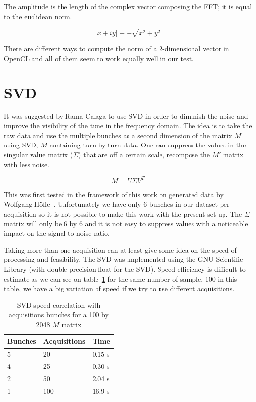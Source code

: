 The amplitude is the length of the complex vector composing the \gls{FFT}; it is equal to the euclidean norm. 

$$\mid x + i y \mid \equiv +\sqrt{x^2 + y^2}$$ 

There are different ways to compute the norm of a 2-dimensional vector in \gls{OpenCL} and all of them seem to work equally well in our test.

\section{SVD}
\label{sec:SVD}

It was suggested by Rama Calaga to use \gls{SVD} in order to diminish the noise and improve the visibility of the tune in the frequency domain. The idea is to take the raw data and use the multiple bunches as a second dimension of the matrix $M$ using SVD, $M$ containing turn by turn data. One can suppress the values in the singular value matrix ($\Sigma$) that are off a certain scale, recompose the $M'$ matrix with less noise.

$$M = U \Sigma V^{T}$$ 

This was first tested in the framework of this work on generated data by Wolfgang H{\"o}f\/le~\cite{HofleEvian10}. Unfortunately we have only 6 bunches in our dataset per acquisition so it is not possible to make this work with the present set up. The $\Sigma$ matrix will only be 6 by 6 and it is not easy to suppress values with a noticeable impact on the signal to noise ratio.

Taking more than one acquisition can at least give some idea on the speed of processing and feasibility. The SVD was implemented using the GNU Scientific Library (with double precision float for the SVD). Speed efficiency is difficult to estimate as we can see on table~\ref{tab:SVD} for the same number of sample, 100 in this table, we have a big variation of speed if we try to use different acquisitions.

\begin{table}[H]
\caption{SVD speed correlation with acquisitions bunches for a 100 by 2048 $M$ matrix}
\label{tab:SVD}
\centering
\begin{tabular}{|l|l|l|}
\hline
Bunches & Acquisitions & Time \\
\hline
5 & 20 & 0.15 s \\
4 & 25 & 0.30 s \\
2 & 50 & 2.04 s \\
1 & 100 & 16.9 s \\
\hline
\end{tabular}
\end{table}

